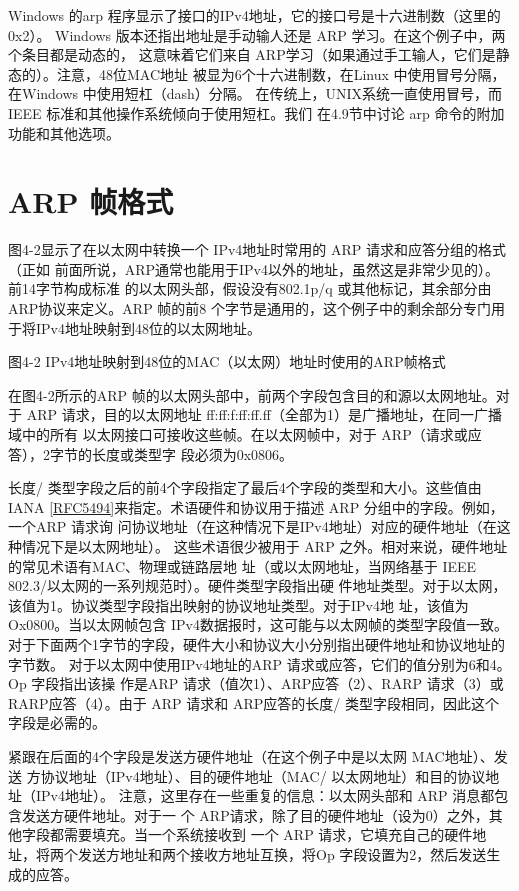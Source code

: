 Windows 的arp 程序显示了接口的IPv4地址，它的接口号是十六进制数（这里的0x2）。
Windows 版本还指出地址是手动输人还是 ARP 学习。在这个例子中，两个条目都是动态的，
这意味着它们来自 ARP学习（如果通过手工输人，它们是静态的）。注意，48位MAC地址
被显为6个十六进制数，在Linux 中使用冒号分隔，在Windows 中使用短杠（dash）分隔。
在传统上，UNIX系统一直使用冒号，而IEEE 标准和其他操作系统倾向于使用短杠。我们
在4.9节中讨论 arp 命令的附加功能和其他选项。

\section{ARP 帧格式}

图4-2显示了在以太网中转换一个 IPv4地址时常用的 ARP 请求和应答分组的格式（正如
前面所说，ARP通常也能用于IPv4以外的地址，虽然这是非常少见的）。前14字节构成标准
的以太网头部，假设没有802.1p/q 或其他标记，其余部分由 ARP协议来定义。ARP 帧的前8
个字节是通用的，这个例子中的剩余部分专门用于将IPv4地址映射到48位的以太网地址。

图4-2 IPv4地址映射到48位的MAC（以太网）地址时使用的ARP帧格式

在图4-2所示的ARP 帧的以太网头部中，前两个字段包含目的和源以太网地址。对于
ARP 请求，目的以太网地址 ff:ff:f:ff:ff.ff（全部为1）是广播地址，在同一广播域中的所有
以太网接口可接收这些帧。在以太网帧中，对于 ARP（请求或应答），2字节的长度或类型字
段必须为0x0806。

长度/ 类型字段之后的前4个字段指定了最后4个字段的类型和大小。这些值由IANA
\href{https://www.rfc-editor.org/rfc/rfc5494}{[RFC5494]}来指定。术语硬件和协议用于描述
ARP 分组中的字段。例如，一个ARP 请求询
问协议地址（在这种情况下是IPv4地址）对应的硬件地址（在这种情况下是以太网地址）。
这些术语很少被用于 ARP 之外。相对来说，硬件地址的常见术语有MAC、物理或链路层地
址（或以太网地址，当网络基于 IEEE 802.3/以太网的一系列规范时）。硬件类型字段指出硬
件地址类型。对于以太网，该值为1。协议类型字段指出映射的协议地址类型。对于IPv4地
址，该值为Ox0800。当以太网帧包含 IPv4数据报时，这可能与以太网帧的类型字段值一致。
对于下面两个1字节的字段，硬件大小和协议大小分别指出硬件地址和协议地址的字节数。
对于以太网中使用IPv4地址的ARP 请求或应答，它们的值分别为6和4。Op 字段指出该操
作是ARP 请求（值次1）、ARP应答（2）、RARP 请求（3）或RARP应答（4）。由于 ARP
请求和 ARP应答的长度/ 类型字段相同，因此这个字段是必需的。

紧跟在后面的4个字段是发送方硬件地址（在这个例子中是以太网 MAC地址）、发送
方协议地址（IPv4地址）、目的硬件地址（MAC/ 以太网地址）和目的协议地址（IPv4地址）。
注意，这里存在一些重复的信息：以太网头部和 ARP 消息都包含发送方硬件地址。对于一
个 ARP请求，除了目的硬件地址（设为0）之外，其他字段都需要填充。当一个系统接收到
一个 ARP 请求，它填充自己的硬件地址，将两个发送方地址和两个接收方地址互换，将Op
字段设置为2，然后发送生成的应答。

